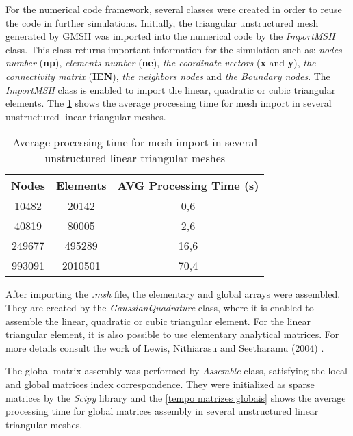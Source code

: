 For the numerical code framework, several classes were created in 
order to reuse the code in further simulations. 
Initially, the triangular unstructured mesh generated by GMSH \cite{gmsh}
was imported into the numerical code by the \textit{ImportMSH} class.
This class returns important information for the simulation 
such as:
\textit{nodes number} (\textbf{np}), 
\textit{elements number} (\textbf{ne}), 
\textit{the coordinate vectors} (\textbf{x} and \textbf{y}), 
\textit{the connectivity matrix} (\textbf{IEN}),
\textit{the neighbors nodes} and 
\textit{the Boundary nodes}. 
The \textit{ImportMSH} class is 
enabled to import the linear, quadratic or cubic triangular elements.
The \ref{tempo malha} shows the average processing time for 
mesh import in several unstructured linear triangular meshes.

\vspace{0.5cm}
\begin{table}[H]
\centering
\begin{tabular}{ccc}
\toprule
\textbf{Nodes} & \textbf{Elements} & \textbf{AVG Processing Time} (s) \\
\midrule
10482 & 20142 & 0,6 \\
40819 & 80005 & 2,6 \\
249677 & 495289 & 16,6 \\
993091 & 2010501 & 70,4 \\
\bottomrule
\end{tabular}
\caption{Average processing time for mesh import in several unstructured linear triangular meshes}
\label{tempo malha}
\end{table}

\medskip
After importing the \textit{.msh} file, the elementary and global arrays 
were assembled. 
They are created by the \textit{GaussianQuadrature} class, where it is enabled to assemble the linear, quadratic or cubic triangular element.
For the linear 
triangular element, it is also possible to use elementary 
analytical matrices. For more details consult the work of Lewis, 
Nithiarasu and Seetharamu (2004) \cite{lewis2004}.

\medskip
The global matrix assembly was performed by \textit{Assemble} class, satisfying the local and global matrices index correspondence.
They were initialized as sparse matrices by 
the \textit{Scipy} library \cite{scipy} and 
the \ref{tempo matrizes globais} shows the average processing time 
for global matrices assembly in several unstructured linear 
triangular meshes.

